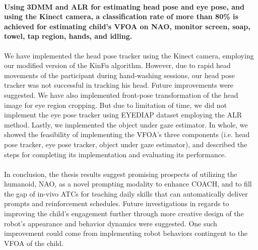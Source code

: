 \documentclass{ut-thesis}
\begin{document}
\paragraph{Using 3DMM and ALR for estimating head pose and eye pose, and using the Kinect camera, a classification rate of more than 80\% is achieved for estimating child's VFOA on NAO, monitor screen, soap, towel, tap region, hands, and idling.}
We have implemented the head pose tracker using the Kinect camera, employing our modified version of the KinFu algorithm.  However, due to rapid head movements of the participant during hand-washing sessions, our head pose tracker was not successful in tracking his head.  Future improvements were suggested.  We have also implemented front-pose transformation of the head image for eye region cropping.  But due to limitation of time, we did not implement the eye pose tracker using EYEDIAP dataset employing the ALR method.  Lastly, we implemented the object under gaze estimator.  In whole, we showed the feasibility of implementing the VFOA's three components (i.e. head pose tracker, eye pose tracker, object under gaze estimator), and described the steps for completing its implementation and evaluating its performance.
\\
\\
In conclusion, the thesis results suggest promising prospects of utilizing the humanoid, NAO, as a novel prompting modality to enhance COACH, and to fill the gap of in-vivo ATCs for teaching daily skills that can automatically deliver prompts and reinforcement schedules.  Future investigations in regards to improving the child's engagement further through more creative design of the robot's appearance and behavior dynamics were suggested.  One such improvement could come from implementing robot behaviors contingent to the VFOA of the child.

\end{document}

